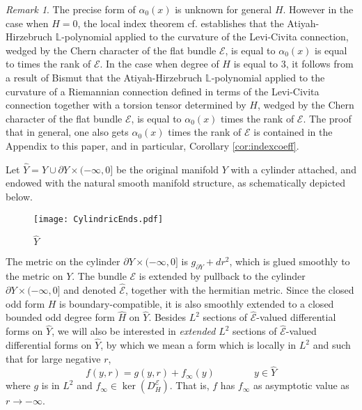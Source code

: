 \documentclass[12pt]{amsart}
\theoremstyle{plain}
\theoremstyle{definition}
\theoremstyle{remark}
\newtheorem{remark}[theorem]{Remark}
\begin{document}
\begin{remark}\label{rem:sig1} The precise form of $\alpha_0(x)$ is unknown for general $H$. However in the case when $H=0$, the local index theorem cf. \cite{BGV} establishes that the Atiyah-Hirzebruch
${\mathbb{L}}$-polynomial applied to the curvature of the Levi-Civita connection, wedged by the Chern character of the flat bundle 
${\mathcal E}$, is equal to
 $\alpha_0(x)$ is equal to  times the rank of ${\mathcal E}$.
   In the case when degree of $H$ is equal to 3, it  follows from a result of Bismut \cite{Bismut} that the Atiyah-Hirzebruch
${\mathbb{L}}$-polynomial applied to the curvature of a Riemannian connection defined in terms of the 
Levi-Civita connection together with a torsion tensor determined by $H$, wedged by the Chern character of the flat bundle 
${\mathcal E}$,  is equal to
 $\alpha_0(x)$ times the rank of ${\mathcal E}$. The proof that in general, one also gets
  $\alpha_0(x)$ times the rank of ${\mathcal E}$ is contained in the Appendix to this paper, and in particular,
Corollary
\ref{cor:indexcoeff}.
\end{remark}

Let $\hat Y = Y \cup \partial Y \times (-\infty, 0]$ be the original manifold $Y$ with a cylinder attached, 
and endowed with the natural smooth manifold structure, as schematically depicted below.

\begin{figure}[h]
\texttt{[image: CylindricEnds.pdf]}\\
\caption{$\hat Y$}
\label{fig:cylinder}
\end{figure}

The metric on the cylinder $ \partial Y \times (-\infty, 0]$ is $g_{\partial Y} + dr^2$, which is glued smoothly to the 
metric on $Y$. The bundle ${\mathcal E}$ is extended by pullback to the cylinder $ \partial Y \times (-\infty, 0]$ and denoted
$\hat{\mathcal E}$, together 
with the hermitian metric. {{Since the closed odd form $H$ is boundary-compatible, it is also smoothly extended to a closed bounded odd degree form $\hat H$ on $\hat Y$. }}
Besides $L^2$ sections of $\hat {\mathcal E}$-valued differential forms on $\hat Y$, we will also
be interested in {\em extended}  $L^2$ sections of $\hat {\mathcal E}$-valued differential forms on $\hat Y$, by which we
mean a form which is locally in $L^2$ and such that for large negative $r$, 
$$
f(y, r) = g(y, r) + f_\infty(y)\qquad \qquad y \in \hat Y
$$
where $g$ is in $L^2$ and $f_\infty \in \ker(D^{\mathcal E}_H)$. That is, $f$ has $f_\infty$ as asymptotic value as $r\to-\infty$. 
\end{document}
